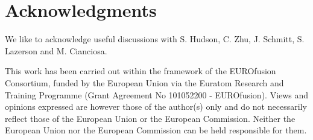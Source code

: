 \section{Acknowledgments}
\label{sec:acknowledgments}
We like to acknowledge useful discussions with
S. Hudson, C. Zhu, J. Schmitt, S. Lazerson and M. Cianciosa.

This work has been carried out within the framework of the EUROfusion Consortium,
funded by the European Union via the Euratom Research and Training Programme (Grant Agreement No 101052200 - EUROfusion).
Views and opinions expressed are however those of the author(s) only
and do not necessarily reflect those of the European Union or the European Commission.
Neither the European Union nor the European Commission can be held responsible for them.
